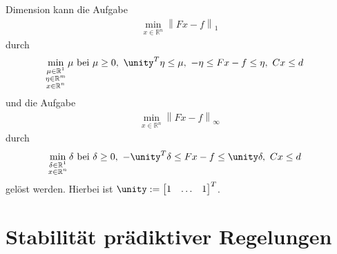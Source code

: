 Dimension kann die Aufgabe
\begin{align*}
	\min\limits_{x\in\mathbb{R}^n}\left\| F x-f \right\|_1
\end{align*}
durch
\begin{align*}
	\min\limits_{\substack{\mu\in\mathbb{R}^1\\\eta\in\mathbb{R}^m\\x\in\mathbb{R}^n }}\mu & \text{ bei } \mu\ge 0,\ \unity^T\eta\le \mu,\ -\eta\le Fx-f\le\eta,\ Cx\le d
\end{align*}
und die Aufgabe 
\begin{align*}
	\min\limits_{x\in\mathbb{R}^n}\left\| F x-f \right\|_{\infty}
\end{align*}
durch
\begin{align*}
	\min\limits_{\substack{\delta\in\mathbb{R}^1\\x\in\mathbb{R}^n }}\delta & \text{ bei } \delta\ge 0,\ -\unity^T\delta\le Fx-f\le\unity\delta,\ Cx\le d
\end{align*}
gelöst werden. Hierbei ist $\unity:=\begin{bmatrix}1 & \ldots & 1 \end{bmatrix}^T$.

\section{Stabilität prädiktiver Regelungen}
